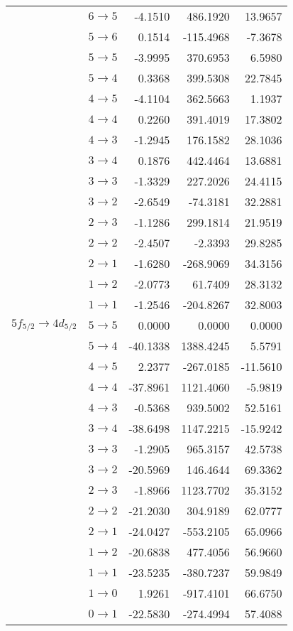\begin{table}[b]
\begin{tiny}
\begin{tabular}{cc|rrr}
 & $6 \rightarrow 5$ &-4.1510&486.1920&13.9657\\
 & $5 \rightarrow 6$ &0.1514&-115.4968&-7.3678\\
 & $5 \rightarrow 5$ &-3.9995&370.6953&6.5980\\
 & $5 \rightarrow 4$ &0.3368&399.5308&22.7845\\
 & $4 \rightarrow 5$ &-4.1104&362.5663&1.1937\\
 & $4 \rightarrow 4$ &0.2260&391.4019&17.3802\\
 & $4 \rightarrow 3$ &-1.2945&176.1582&28.1036\\
 & $3 \rightarrow 4$ &0.1876&442.4464&13.6881\\
 & $3 \rightarrow 3$ &-1.3329&227.2026&24.4115\\
 & $3 \rightarrow 2$ &-2.6549&-74.3181&32.2881\\
 & $2 \rightarrow 3$ &-1.1286&299.1814&21.9519\\
 & $2 \rightarrow 2$ &-2.4507&-2.3393&29.8285\\
 & $2 \rightarrow 1$ &-1.6280&-268.9069&34.3156\\
 & $1 \rightarrow 2$ &-2.0773&61.7409&28.3132\\
 & $1 \rightarrow 1$ &-1.2546&-204.8267&32.8003\\[4pt]
$5f_{5/2} \rightarrow 4d_{5/2}$ & $5 \rightarrow 5$ &0.0000&0.0000&0.0000\\
 & $5 \rightarrow 4$ &-40.1338&1388.4245&5.5791\\
 & $4 \rightarrow 5$ &2.2377&-267.0185&-11.5610\\
 & $4 \rightarrow 4$ &-37.8961&1121.4060&-5.9819\\
 & $4 \rightarrow 3$ &-0.5368&939.5002&52.5161\\
 & $3 \rightarrow 4$ &-38.6498&1147.2215&-15.9242\\
 & $3 \rightarrow 3$ &-1.2905&965.3157&42.5738\\
 & $3 \rightarrow 2$ &-20.5969&146.4644&69.3362\\
 & $2 \rightarrow 3$ &-1.8966&1123.7702&35.3152\\
 & $2 \rightarrow 2$ &-21.2030&304.9189&62.0777\\
 & $2 \rightarrow 1$ &-24.0427&-553.2105&65.0966\\
 & $1 \rightarrow 2$ &-20.6838&477.4056&56.9660\\
 & $1 \rightarrow 1$ &-23.5235&-380.7237&59.9849\\
 & $1 \rightarrow 0$ &1.9261&-917.4101&66.6750\\
 & $0 \rightarrow 1$ &-22.5830&-274.4994&57.4088
\end{tabular}
\end{tiny}
\end{table}%
%


